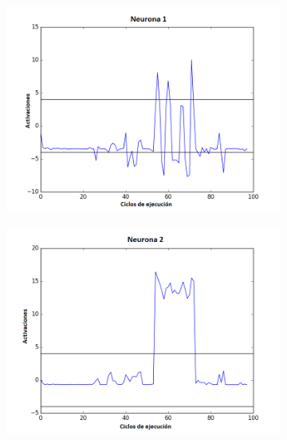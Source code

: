 \begin{figure}[!h]
    \centering %
\begin{subfigure}{0.33\textwidth}
  \includegraphics[width=\linewidth]{Imagenes/Agente1Activaciones/Agente2/Neurona0}
\end{subfigure}\hfil %
\begin{subfigure}{0.33\textwidth}
  \includegraphics[width=\linewidth]{Imagenes/Agente1Activaciones/Agente2/Neurona1}
\end{subfigure}\hfil %
\begin{subfigure}{0.33\textwidth}

\end{subfigure}
\end{figure}
